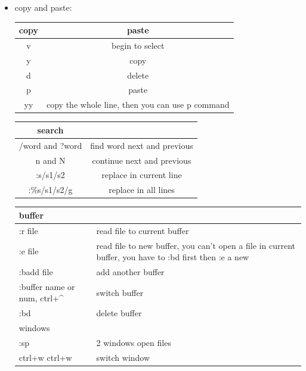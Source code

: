 \documentclass[a4paper,12pt,twoside]{book}
\begin{document}
\begin{itemize}
\begin{center}
\begin{tabular}{c|c|c}
		
			\end{tabular}
	\end{center}


    
    \item copy and paste:
    
    \begin{center}
        \begin{tabular}{c|c}
		copy & paste\\
		\hline v & begin to select\\
		y & copy\\
		d & delete\\
		p & paste \\
		yy & copy the whole line, then you can use p command  \\
		
			\end{tabular}
	\end{center}
	

		
		
		\begin{center}
		\begin{tabular}{c|c}
				
		
		\hline
		search & \\
		\hline 
		/word and ?word & find word next and previous\\
		\hline  
		n and  N & continue next and previous\\
		\hline  
		:s/s1/s2 & replace in current line\\
		\hline  
		:\%s/s1/s2/g & replace in all lines\\
		\hline
		\end{tabular}
	\end{center}


	\begin{center}
		\begin{tabular}{|p{}|p{}|}
		\hline buffer &  \\
		\hline :r file & read file to current buffer \\ 
		\hline :e file & read file to new buffer, you can't open a file in current buffer, you have to :bd first then :e a new  \\ 
		\hline :badd file  & add another buffer  \\
		\hline :buffer name or num, ctrl+\^{} & switch buffer \\ 
		\hline :bd  & delete buffer \\ 
		\hline 
		\hline windows &  \\
		\hline :sp & 2 windows open files \\
		\hline ctrl+w ctrl+w  & switch window \\
		\end{tabular}
	\end{center}
	

\end{itemize}
\end{document}
